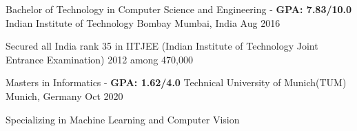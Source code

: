 
\begin{cventries}
  	
  	\cventry
    {Bachelor of Technology in Computer Science and Engineering - \textbf{GPA: 7.83/10.0}} %
    {Indian Institute of Technology Bombay} %
    {Mumbai, India} %
    {Aug 2016} %
    {
		\begin{cvitems}
			\item {Secured all India rank 35 in IITJEE (Indian Institute of Technology Joint Entrance Examination) 2012 among 470,000}
		\end{cvitems}
    }
	
	\cventry
	{Masters in Informatics - \textbf{GPA: 1.62/4.0}} %
	{Technical University of Munich(TUM)} %
	{Munich, Germany} %
	{Oct 2020} %
	{
		\begin{cvitems}
			\item {Specializing in Machine Learning and Computer Vision}
		\end{cvitems}
	}

\end{cventries}
